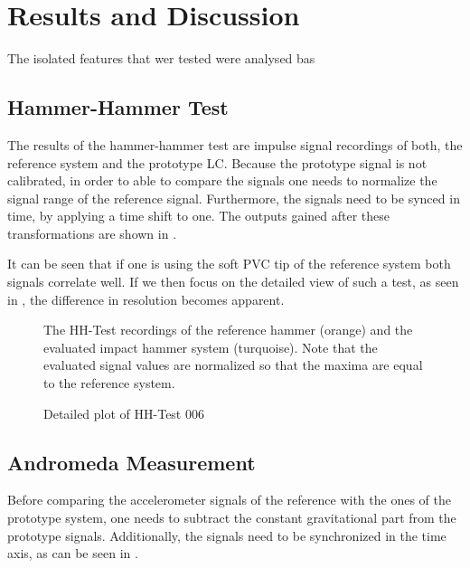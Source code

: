 \chapter{Results and Discussion}
\label{chp:results}

The isolated features that wer tested were analysed bas

\section{Hammer-Hammer Test}

The results of the hammer-hammer test are impulse signal recordings of both, the reference system and the prototype \ac{LC}. Because the prototype signal is not calibrated, in order to able to compare the signals one needs to normalize the signal range of the reference signal. Furthermore, the signals need to be synced in time, by applying a time shift to one. The outputs gained after these transformations are shown in .

It can be seen that if one is using the soft PVC tip of the reference system both signals correlate well. If we then focus on the detailed view of such a test, as seen in , the difference in resolution becomes apparent.

\begin{figure}[!htb]
    \centering
    
    \caption[HH-Test comparison]{The HH-Test recordings of the reference hammer (orange) and the evaluated impact hammer system (turquoise). Note that the evaluated signal values are normalized so that the maxima are equal to the reference system.}
    \label{fig:HH_comparison}
\end{figure}
\begin{figure}[!htb]
    \centering
    
    \caption[HH006 Plot]{Detailed plot of HH-Test 006 }
    \label{fig:HH_noise}
\end{figure}

\section{Andromeda Measurement}
Before comparing the accelerometer signals of the reference with the ones of the prototype system, one needs to subtract the constant gravitational part from the prototype signals. Additionally, the signals need to be synchronized in the time axis, as can be seen in .


